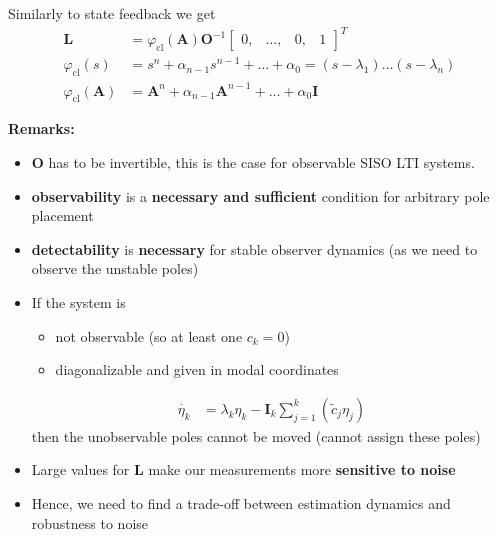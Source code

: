 Similarly to state feedback we get
\begin{align*}
    \mathbf{L}                        & =\varphi_{\mathrm{cl}}(\mathbf{A})\mathbf{O}^{-1}\begin{bmatrix}
                                                                                             0, & \ldots, & 0, & 1
                                                                                         \end{bmatrix}^T    \\
    \varphi_{\mathrm{cl}}(s)          & =s^n+\alpha_{n-1}s^{n-1}+\ldots+\alpha_0=(s-\lambda_1)\ldots(s-\lambda_n) \\
    \varphi_{\mathrm{cl}}(\mathbf{A}) & =\mathbf{A}^n+\alpha_{n-1}\mathbf{A}^{n-1}+\ldots+\alpha_0 \mathbf{I}
\end{align*}

\textbf{Remarks:}
\begin{itemize}
    \item $\mathbf{O}$ has to be invertible, this is the case for observable SISO LTI systems.
    \item \textbf{observability} is a \textbf{necessary and sufficient} condition for arbitrary pole placement
    \item \textbf{detectability} is \textbf{necessary} for stable observer dynamics (as we need to observe the unstable poles)
    \item If the system is
          \begin{itemize}
              \item not observable (so at least one $c_k=0$)
              \item diagonalizable and given in modal coordinates
          \end{itemize}
          \begin{align*}
              \dot{\eta_k} & =\lambda_k\eta_k-\mathbf{I}_k\sum_{j=1}^k\left(\tilde{c}_j\eta_j\right)
          \end{align*}
          then the unobservable poles cannot be moved (cannot assign these poles)
\end{itemize}


\begin{itemize}
    \item Large values for $\mathbf{L}$ make our measurements more \textbf{sensitive to noise}
    \item Hence, we need to find a trade-off between estimation dynamics and robustness to noise
\end{itemize}

